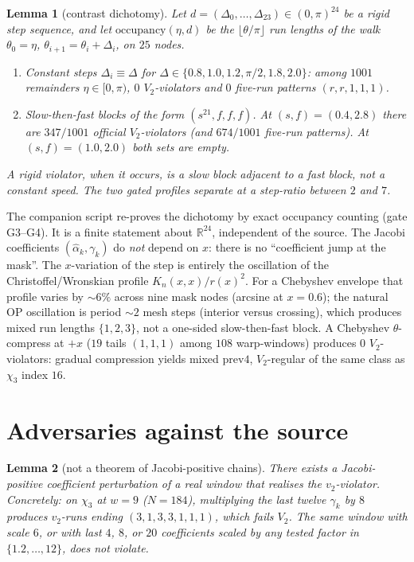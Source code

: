 \documentclass[11pt]{article}
\newtheorem{lemma}{Lemma}
\theoremstyle{remark}
\newcommand{\R}{\mathbb{R}}
\begin{document}
\begin{lemma}[contrast dichotomy]\label{lem:contrast}
Let $d=(\Delta_0,\ldots,\Delta_{23})\in(0,\pi)^{24}$ be a rigid
step sequence, and let $\mathrm{occupancy}(\eta,d)$ be the
$\lfloor\theta/\pi\rfloor$ run lengths of the walk
$\theta_0=\eta$, $\theta_{i+1}=\theta_i+\Delta_i$, on $25$
nodes.
\begin{enumerate}
\item Constant steps $\Delta_i\equiv\Delta$ for
  $\Delta\in\{0.8,1.0,1.2,\pi/2,1.8,2.0\}$: among $1001$
  remainders $\eta\in[0,\pi)$, $0$ $V_2$-violators and $0$
  five-run patterns $(r,r,1,1,1)$.
\item Slow-then-fast blocks of the form
  $(s^{21},f,f,f)$.  At $(s,f)=(0.4,2.8)$ there are $347/1001$
  official $V_2$-violators (and $674/1001$ five-run patterns).
  At $(s,f)=(1.0,2.0)$ both sets are empty.
\end{enumerate}
A rigid violator, when it occurs, is a slow block adjacent to
a fast block, not a constant speed.  The two gated profiles
separate at a step-ratio between $2$ and $7$.
\end{lemma}

The companion script re-proves the dichotomy by exact
occupancy counting (gate G3--G4).  It is a finite statement
about $\R^{24}$, independent of the source.  The Jacobi
coefficients $(\hat\alpha_k,\gamma_k)$ do \emph{not} depend on
$x$: there is no ``coefficient jump at the mask''.  The
$x$-variation of the step is entirely the oscillation of the
Christoffel/Wronskian profile $K_n(x,x)/r(x)^2$.  For a
Chebyshev envelope that profile varies by $\sim 6\%$ across
nine mask nodes (arcsine at $x=0.6$); the natural OP
oscillation is period $\sim 2$ mesh steps (interior versus
crossing), which produces mixed run lengths $\{1,2,3\}$, not a
one-sided slow-then-fast block.  A Chebyshev $\theta$-compress
at $+x$ ($19$ tails $(1,1,1)$ among $108$ warp-windows)
produces $0$ $V_2$-violators: gradual compression yields mixed
$\mathrm{prev4}$, $V_2$-regular of the same class as $\chi_3$
index $16$.

\section{Adversaries against the source}\label{sec:adv}

\begin{lemma}[not a theorem of Jacobi-positive chains]\label{lem:not-abstract}
There exists a Jacobi-positive coefficient perturbation of a
real window that realises the $v_2$-violator.  Concretely: on
$\chi_3$ at $w=9$ ($N=184$), multiplying the last twelve
$\gamma_k$ by $8$ produces $v_2$-runs ending
$(3,1,3,3,1,1,1)$, which fails $V_2$.  The same window with
scale $6$, or with last $4$, $8$, or $20$ coefficients scaled
by any tested factor in $\{1.2,\ldots,12\}$, does not violate.
\end{lemma}
\end{document}
